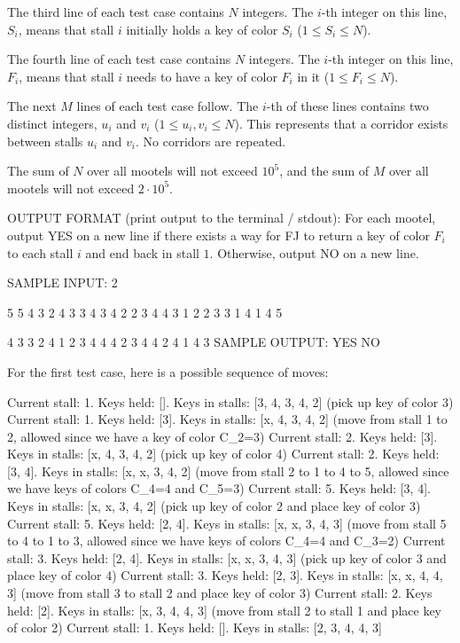 \documentclass[12pt]{article}
\begin{document}
The third line of each test case contains $N$ integers. The $i$-th integer on
this line, $S_i$, means that stall $i$ initially holds a key of color $S_i$
($1 \le S_i \le N$).

The fourth line of each test case contains $N$ integers. The $i$-th integer on
this line, $F_i$, means that stall $i$ needs to have a key of color $F_i$ in it
($1 \le F_i \le N$).

The next $M$ lines of each test case follow. The $i$-th of these lines contains
two distinct integers, $u_i$ and $v_i$ ($1 \le u_i, v_i \le N$). This represents
that a corridor exists between stalls $u_i$ and $v_i$. No corridors are
repeated.

The sum of $N$ over all mootels will not exceed $10^5$, and the sum of $M$ over
all mootels will not exceed $2\cdot 10^5$.

OUTPUT FORMAT (print output to the terminal / stdout):
For each mootel, output YES on a new line if there exists a way for FJ to return
a key of color $F_i$ to each stall $i$ and end back in stall $1$. Otherwise,
output NO on a new line.

SAMPLE INPUT:
2

5 5
4 3 2 4 3
3 4 3 4 2
2 3 4 4 3
1 2
2 3
3 1
4 1
4 5

4 3
3 2 4 1
2 3 4 4
4 2 3 4
4 2
4 1
4 3
SAMPLE OUTPUT: 
YES
NO

For the first test case, here is a possible sequence of moves:


Current stall: 1. Keys held: []. Keys in stalls: [3, 4, 3, 4, 2]
(pick up key of color 3)
Current stall: 1. Keys held: [3]. Keys in stalls: [x, 4, 3, 4, 2]
(move from stall 1 to 2, allowed since we have a key of color C_2=3)
Current stall: 2. Keys held: [3]. Keys in stalls: [x, 4, 3, 4, 2]
(pick up key of color 4)
Current stall: 2. Keys held: [3, 4]. Keys in stalls: [x, x, 3, 4, 2]
(move from stall 2 to 1 to 4 to 5, allowed since we have keys of colors C_4=4 and C_5=3)
Current stall: 5. Keys held: [3, 4]. Keys in stalls: [x, x, 3, 4, 2]
(pick up key of color 2 and place key of color 3)
Current stall: 5. Keys held: [2, 4]. Keys in stalls: [x, x, 3, 4, 3]
(move from stall 5 to 4 to 1 to 3, allowed since we have keys of colors C_4=4 and C_3=2)
Current stall: 3. Keys held: [2, 4]. Keys in stalls: [x, x, 3, 4, 3]
(pick up key of color 3 and place key of color 4)
Current stall: 3. Keys held: [2, 3]. Keys in stalls: [x, x, 4, 4, 3]
(move from stall 3 to stall 2 and place key of color 3)
Current stall: 2. Keys held: [2]. Keys in stalls: [x, 3, 4, 4, 3]
(move from stall 2 to stall 1 and place key of color 2)
Current stall: 1. Keys held: []. Keys in stalls: [2, 3, 4, 4, 3]
\end{document}
